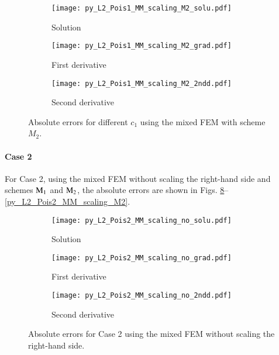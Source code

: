 \documentclass[review,3p]{elsarticle}
\begin{document}
\begin{figure}[!ht]
    \begin{subfigure}{5.5cm}
        \texttt{[image: py\_L2\_Pois1\_MM\_scaling\_M2\_solu.pdf]}
        \caption{Solution}
        \label{py_L2_Pois1_MM_scaling_M2_solu}
    \end{subfigure}
    \hspace{-0.2cm}
    \begin{subfigure}{5.5cm}
        \texttt{[image: py\_L2\_Pois1\_MM\_scaling\_M2\_grad.pdf]}
        \caption{First derivative}
        \label{py_L2_Pois1_MM_scaling_M2_grad}
    \end{subfigure}
    \hspace{-0.2cm}
    \begin{subfigure}{5.5cm}
        \texttt{[image: py\_L2\_Pois1\_MM\_scaling\_M2\_2ndd.pdf]}
        \caption{Second derivative}
        \label{py_L2_Pois1_MM_scaling_M2_2ndd}
    \end{subfigure}
\caption{Absolute errors for different $c_1$ using the mixed FEM with scheme $M_2$.}
\label{py_L2_Pois1_MM_scaling_M2}
\end{figure}


\paragraph{Case 2}
For Case 2, using the mixed FEM without scaling the right-hand side and schemes ${\rm M}_1$ and ${\rm M}_2$, the absolute errors are shown in Figs. \ref{py_L2_Pois2_MM_scaling_no}--\ref{py_L2_Pois2_MM_scaling_M2}.

\begin{figure}[!ht]
    \begin{subfigure}{5.5cm}
        \texttt{[image: py\_L2\_Pois2\_MM\_scaling\_no\_solu.pdf]}
        \caption{Solution}
        \label{py_L2_Pois2_MM_scaling_no_solu}
    \end{subfigure}
    \hspace{-0.2cm}
    \begin{subfigure}{5.5cm}
        \texttt{[image: py\_L2\_Pois2\_MM\_scaling\_no\_grad.pdf]}
        \caption{First derivative}
        \label{py_L2_Pois2_MM_scaling_no_grad}
    \end{subfigure}
    \hspace{-0.2cm}
    \begin{subfigure}{5.5cm}
        \texttt{[image: py\_L2\_Pois2\_MM\_scaling\_no\_2ndd.pdf]}
        \caption{Second derivative}
        \label{py_L2_Pois2_MM_scaling_no_2ndd}
    \end{subfigure}
\caption{Absolute errors for Case 2 using the mixed FEM without scaling the right-hand side.}
\label{py_L2_Pois2_MM_scaling_no}
\end{figure}
\end{document}
